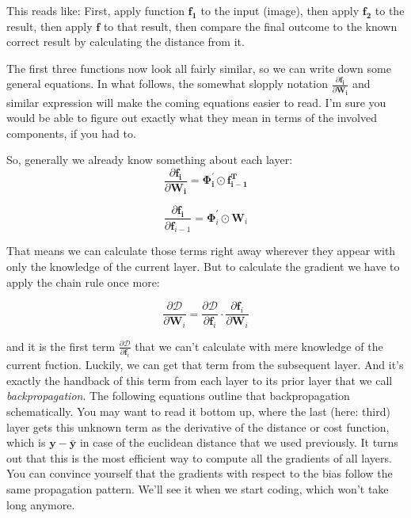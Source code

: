 \documentclass[]{report}
\begin{document}
This reads like: First, apply function \(\mathbf{f_1}\) to the input (image), then apply \(\mathbf{f_2}\) to the result, then apply \(\mathbf{f}\) to that result, then compare the final outcome to the known correct result by calculating the distance from it.

The first three functions now look all fairly similar, so we can write down some general equations. In what follows, the somewhat slopply notation \( \frac{\partial{\mathbf{f_i} }}{\partial{\mathbf{W_i} }} \) and similar expression will make the coming equations easier to read. I'm sure you would be able to figure out exactly what they mean in terms of the involved components, if you had to.

So, generally we already know something about each layer:
\begin{equation}\label{dfdw}
	\frac{\partial{\mathbf{f_i} }}{\partial{\mathbf{W_i} }} = \mathbf{\Phi_i^\prime} \odot \mathbf{f_{i-1}^T}
\end{equation}

\begin{equation}\label{dfdf}
	\frac{\partial{\mathbf{f_i }}}{\partial{\mathbf{f}_{i-1} }} = \mathbf{\Phi}^\prime_i \odot \mathbf{W}_i
\end{equation}

That means we can calculate those terms right away wherever they appear with only the knowledge of the current layer. But to calculate the gradient we have to apply the chain rule once more:

\begin{equation}
\frac{\partial \mathcal{D}}{\partial{\mathbf{W}_i }}=
\frac{\partial \mathcal{D}}{\partial \mathbf{f}_i} \cdot 
\frac{\partial{\mathbf{f}_i }}{\partial{\mathbf{W}_i }}  
\end{equation}

and it is the first term \(\frac{\partial \mathcal{D}}{\partial \mathbf{f}_i}\) that we can't calculate with mere knowledge of the current fuction. Luckily, we can get that term from the subsequent layer. And it's exactly the handback of this term from each layer to its prior layer that we call \emph{backpropagation}. The following equations outline that backpropagation schematically. You may want to read it bottom up, where the last (here: third) layer gets this unknown term as the derivative of the distance or cost function, which is \(\mathbf{y} - \mathbf{\bar{y}} \) in case of the euclidean distance that we used previously. It turns out that this is the most efficient way to compute all the gradients of all layers. You can convince yourself that the gradients with respect to the bias follow the same propagation pattern. We'll see it when we start coding, which won't take long anymore.
\end{document}
